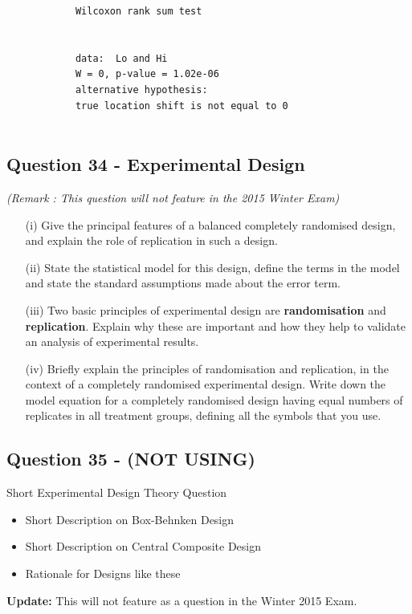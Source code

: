\documentclass[a4paper,12pt]{article}
\begin{document}
\begin{itemize}
\begin{itemize}
\begin{framed}
\begin{verbatim}
			Wilcoxon rank sum test
			
			
			data:  Lo and Hi
			W = 0, p-value = 1.02e-06
			alternative hypothesis: 
			true location shift is not equal to 0
			
			\end{verbatim}
		\end{framed}
	\end{itemize}
	
\end{itemize} %

\subsection*{Question 34 - Experimental Design}
\textit{(Remark : This question will not feature in the 2015 Winter Exam)}
\begin{itemize}
	\item[(i)] Give the principal features of a  balanced completely randomised design, and
	explain the role of replication in such a design.  \item[(ii)] State the statistical model for
	this design, define the terms in the model and state the standard assumptions
	made about the error term.
	\item[(iii)] Two basic principles of experimental design are \textbf{randomisation} and
	\textbf{replication}. Explain why these are important and how they help to
	validate an analysis of experimental results. 
	\item[(iv)] Briefly explain the principles of randomisation and replication, in the
	context of a completely randomised experimental design. Write down the model equation for a completely randomised design
	having equal numbers of replicates in all treatment groups, defining all
	the symbols that you use.
\end{itemize}
\subsection*{Question 35 - (NOT USING)}
Short Experimental Design Theory Question
\begin{itemize}
	\item Short Description on Box-Behnken Design
	\item Short Description on Central Composite Design
	\item Rationale for Designs like these
\end{itemize}
\textbf{Update:} This will not feature as a question in the Winter 2015 Exam.
\end{document}
